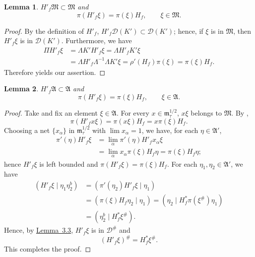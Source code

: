 \documentclass[12pt,b5paper,twoside]{article}
\theoremstyle{takesaki}
\newtheorem{lemma}{Lemma}[section]
\numberwithin{equation}{section}
\begin{document}
\begin{lemma}\label{lem:14.14}
$H'_f\mathfrak M\subset\mathfrak M$ and
\[
 \pi(H'_f\xi)=\pi(\xi)H_f,
 \qquad \xi\in\mathfrak M.
\]
\end{lemma}

\begin{proof}
By the definition of $H'_f$, $H'_f\mathcal D(K')\subset
\mathcal D(K')$; hence, if $\xi$ is in $\mathfrak M$, then $H'_f\xi$
is in $\mathcal D(K')$.  Furthermore, we have
\begin{align*}
 \Pi H'_f\xi
 &=\Lambda K'H'_f\xi
  =\Lambda H'_fK'\xi\\
 &=\Lambda H'_f\Lambda^{-1}\Lambda K'\xi
  =\rho'(H_f)\pi(\xi)
  =\pi(\xi)H_f.
\end{align*}
Therefore  yields our assertion.
\end{proof}

\begin{lemma}\label{lem:14.15}
$H'_f\mathfrak A\subset\mathfrak A$ and
\[
 \pi(H'_f\xi)=\pi(\xi)H_f,
 \qquad \xi\in\mathfrak A.
\]
\end{lemma}

\begin{proof}
Take and fix an element $\xi\in\mathfrak A$.  For every
$x\in\mathfrak m_\tau^{1/2}$, $x\xi$ belongs to $\mathfrak M$.  By
,
\[
 \pi(H'_fx\xi)=\pi(x\xi)H_f=x\pi(\xi)H_f.
\]
Choosing a net $\{x_\alpha\}$ in $\mathfrak m_\tau^{1/2}$ with
$\lim x_\alpha=1$, we have, for each $\eta\in\mathfrak A'$,
\begin{align*}
 \pi'(\eta)H'_f\xi
 &=\lim_\alpha\pi'(\eta)H'_fx_\alpha\xi\\
 &=\lim_\alpha x_\alpha\pi(\xi)H_f\eta
  =\pi(\xi)H_f\eta;
\end{align*}
hence $H'_f\xi$ is left bounded and
$\pi(H'_f\xi)=\pi(\xi)H_f$.  For each
$\eta_1,\eta_2\in\mathfrak A'$, we have
\begin{align*}
 (H'_f\xi\mid\eta_1\eta_2^b)
 &=(\pi'(\eta_2)H'_f\xi\mid\eta_1)\\
 &=(\pi(\xi)H_f\eta_2\mid\eta_1)
  =(\eta_2\mid H_f^*\pi(\xi^{\#})\eta_1)\\
 &=(\eta_2^b\mid H_f^*\xi^{\#}).
\end{align*}
Hence, by \hyperref[lem:3.3]{Lemma~3.3}, $H'_f\xi$ is in
$\mathcal D^{\#}$ and
\begin{equation}
 (H'_f\xi)^{\#}=H_f^*\xi^{\#}.
 \tag{14.16}\label{eq:14.16}
\end{equation}
This completes the proof.
\end{proof}
\end{document}
